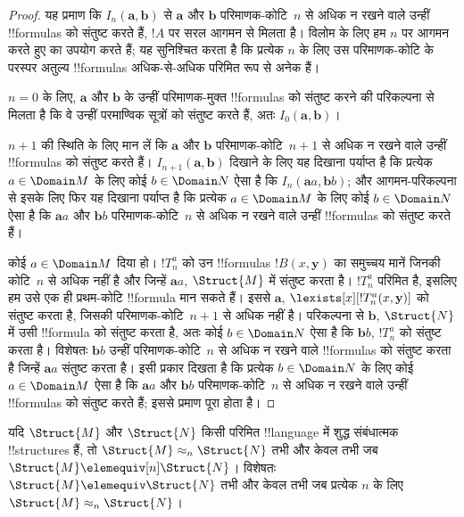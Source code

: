 \documentclass[../../../include/open-logic-section]{subfiles}
\begin{document}
\begin{proof}
  यह प्रमाण कि $I_n(\mathbf{a},\mathbf{b})$ से $\mathbf{a}$ और
  $\mathbf{b}$ परिमाणक-कोटि~$n$ से अधिक न रखने वाले उन्हीं !!{formula}s को
  संतुष्ट करते हैं, $!A$ पर सरल आगमन से मिलता है। विलोम के लिए हम $n$ पर
  आगमन करते हुए  का उपयोग करते हैं; यह सुनिश्चित करता
  है कि प्रत्येक $n$ के लिए उस परिमाणक-कोटि के परस्पर अतुल्य !!{formula}s
  अधिक-से-अधिक परिमित रूप से अनेक हैं।

  $n=0$ के लिए, $\mathbf{a}$ और $\mathbf{b}$ के उन्हीं परिमाणक-मुक्त
  !!{formula}s को संतुष्ट करने की परिकल्पना से मिलता है कि वे उन्हीं परमाण्विक
  सूत्रों को संतुष्ट करते हैं, अतः $I_0(\mathbf{a},\mathbf{b})$।

  $n+1$ की स्थिति के लिए मान लें कि $\mathbf{a}$ और $\mathbf{b}$
  परिमाणक-कोटि~$n+1$ से अधिक न रखने वाले उन्हीं !!{formula}s को संतुष्ट करते
  हैं। $I_{n+1}(\mathbf{a},\mathbf{b})$ दिखाने के लिए यह दिखाना पर्याप्त है
  कि प्रत्येक $a \in \Domain M$ के लिए कोई $b \in
  \Domain N$ ऐसा है कि
  $I_n(\mathbf{a}a,\mathbf{b}b)$; और आगमन-परिकल्पना से इसके लिए फिर यह
  दिखाना पर्याप्त है कि प्रत्येक $a \in
  \Domain M$ के लिए कोई $b \in \Domain N$ ऐसा है कि $\mathbf{a}a$ और
  $\mathbf{b}b$ परिमाणक-कोटि~$n$ से
  अधिक न रखने वाले उन्हीं !!{formula}s को संतुष्ट करते हैं।

  कोई $a \in \Domain M$ दिया हो। $!T^a_n$ को उन !!{formula}s
  $!B(x,\mathbf{y})$ का समुच्चय मानें जिनकी कोटि~$n$ से अधिक नहीं है और
  जिन्हें $\mathbf{a}a$, $\Struct{M}$ में संतुष्ट करता है। $!T^a_n$ परिमित
  है, इसलिए हम उसे एक ही
  प्रथम-कोटि !!{formula} मान सकते हैं। इससे $\mathbf{a}$,
  $\lexists[x][!T^a_n(x,\mathbf{y})]$ को संतुष्ट करता है, जिसकी
  परिमाणक-कोटि~$n+1$ से अधिक नहीं है। परिकल्पना से $\mathbf{b}$,
  $\Struct{N}$ में उसी !!{formula} को संतुष्ट करता है, अतः कोई
  $b \in \Domain N$ ऐसा है कि $\mathbf{b}b$, $!T^a_n$ को संतुष्ट करता है। विशेषतः
  $\mathbf{b}b$ उन्हीं परिमाणक-कोटि~$n$ से अधिक न रखने वाले !!{formula}s को
  संतुष्ट करता है जिन्हें $\mathbf{a}a$ संतुष्ट करता है। इसी प्रकार दिखता है
  कि प्रत्येक $b \in \Domain N$ के लिए कोई $a\in \Domain M$ ऐसा है कि
  $\mathbf{a}a$ और $\mathbf{b}b$ परिमाणक-कोटि~$n$ से अधिक न रखने वाले उन्हीं
  !!{formula}s को संतुष्ट करते हैं; इससे प्रमाण पूरा होता है।
\end{proof}

\begin{cor}
  यदि $\Struct{M}$ और $\Struct{N}$ किसी परिमित !!{language} में शुद्ध
  संबंधात्मक !!{structure}s हैं, तो $\Struct{M} \approx_n\Struct{N}$ तभी
  और केवल तभी जब $\Struct{M} \elemequiv[n] \Struct{N}$। विशेषतः
  $\Struct{M} \elemequiv \Struct{N}$ तभी और केवल तभी जब प्रत्येक $n$ के
  लिए $\Struct{M} \approx_n \Struct{N}$।
\end{cor}
\end{document}
